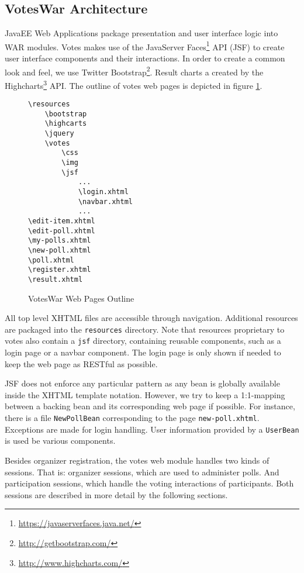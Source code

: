 \subsection{VotesWar Architecture}
JavaEE Web Applications package presentation and user interface logic into WAR modules.
Votes makes use of the JavaServer Faces\footnote{\url{https://javaserverfaces.java.net/}} API (JSF) to create user interface components and their interactions.
In order to create a common look and feel, we use Twitter Bootstrap\footnote{\url{http://getbootstrap.com/}}.
Result charts a created by the Highcharts\footnote{\url{http://www.highcharts.com/}} API.
The outline of votes web pages is depicted in figure \ref{figure:web-directory-outline}.

\begin{figure}[h]
\centering
\begin{minipage}[t]{3cm}
\begin{verbatim}
\resources
    \bootstrap
    \highcarts
    \jquery
    \votes
        \css
        \img
        \jsf
            ...
            \login.xhtml
            \navbar.xhtml
            ...
\edit-item.xhtml
\edit-poll.xhtml
\my-polls.xhtml
\new-poll.xhtml
\poll.xhtml
\register.xhtml
\result.xhtml
\end{verbatim}
\end{minipage}
\caption{VotesWar Web Pages Outline}
\label{figure:web-directory-outline}
\end{figure}

All top level XHTML files are accessible through navigation.
Additional resources are packaged into the \texttt{resources} directory.
Note that resources proprietary to votes also contain a \texttt{jsf} directory, containing reusable components, such as a login page or a navbar component.
The login page is only shown if needed to keep the web page as RESTful as possible.

JSF does not enforce any particular pattern as any bean is globally available inside the XHTML template notation.
However, we try to keep a 1:1-mapping between a backing bean and its corresponding web page if possible.
For instance, there is a file \texttt{NewPollBean} corresponding to the page \texttt{new-poll.xhtml}.
Exceptions are made for login handling. 
User information provided by a \texttt{UserBean} is used be various components.

Besides organizer registration, the votes web module handles two kinds of sessions.
That is: organizer sessions, which are used to administer polls.
And participation sessions, which handle the voting interactions of participants.
Both sessions are described in more detail by the following sections.



